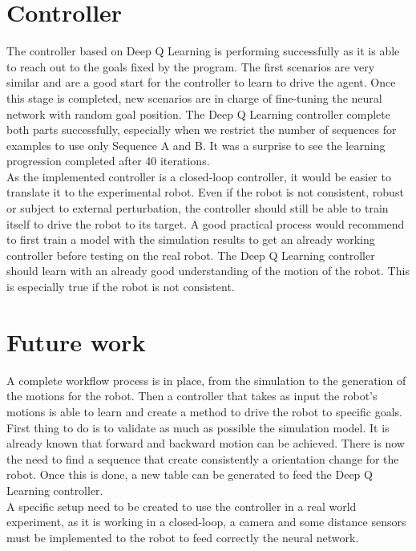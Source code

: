 \section{Controller}
    The controller based on Deep Q Learning is performing successfully as it is able to reach out to the goals fixed by the program. The first scenarios are very similar and are a good start for the controller to learn to drive the agent. Once this stage is completed, new scenarios are in charge of fine-tuning the neural network with random goal position. The Deep Q Learning controller complete both parts successfully, especially when we restrict the number of sequences for examples to use only Sequence A and B. It was a surprise to see the learning progression completed after 40 iterations. \\
    
    As the implemented controller is a closed-loop controller, it would be easier to translate it to the experimental robot. Even if the robot is not consistent, robust or subject to external perturbation, the controller should still be able to train itself to drive the robot to its target. A good practical process would recommend to first train a model with the simulation results to get an already working controller before testing on the real robot. The Deep Q Learning controller should learn with an already good understanding of the motion of the robot. This is especially true if the robot is not consistent.
    
\section{Future work}
    A complete workflow process is in place, from the simulation to the generation of the motions for the robot. Then a controller that takes as input the robot's motions is able to learn and create a method to drive the robot to specific goals. First thing to do is to validate as much as possible the simulation model. It is already known that forward and backward motion can be achieved. There is now the need to find a sequence that create consistently a orientation change for the robot. Once this is done, a new table can be generated to feed the Deep Q Learning controller.\\
    
    A specific setup need to be created to use the controller in a real world experiment, as it is working in a closed-loop, a camera and some distance sensors must be implemented to the robot to feed correctly the neural network.